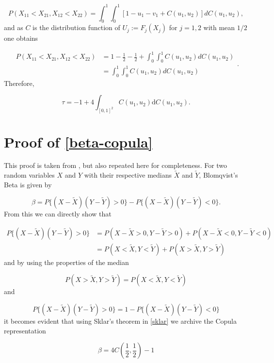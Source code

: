 \begin{equation*}
		P\left(X_{11}<X_{21}, X_{12}<X_{22}\right)=\int_{0}^{1} \int_{0}^{1}\left[1-u_{1}-v_{1}+C\left(u_{1}, u_{2}\right)\right] d C\left(u_{1}, u_{2}\right),
\end{equation*}
%
and as $C$ is the distribution function of $U_j := F_j(X_j)$ for $j = 1,2$ with mean $1/2$ one obtains

\begin{equation*}
	\begin{aligned}
		P\left(X_{11}<X_{21}, X_{12}<X_{22}\right) &=1-\frac{1}{2}-\frac{1}{2}+\int_{0}^{1} \int_{0}^{1} C\left(u_{1}, u_{2}\right) d C\left(u_{1}, u_{2}\right) \\
		&=\int_{0}^{1} \int_{0}^{1} C\left(u_{1}, u_{2}\right) d C\left(u_{1}, u_{2}\right)
	\end{aligned}.
\end{equation*}
%
Therefore, 

\begin{equation}
	\tau=-1+4 \int_{[0,1]^{2}} C\left(u_{1}, u_{2}\right) \mathrm{d} C\left(u_{1}, u_{2}\right).
\end{equation}

\section{Proof of \ref{beta-copula}}

This proof is taken from \citet{genest2013copula}, but also repeated here for completeness. For two random variables $X$ and $Y$ with their respective medians $\tilde{X}$ and $\tilde{Y}$, Blomqvist's Beta is given by 

\begin{equation*}
	\beta=P\{(X-\tilde{X})(Y-\tilde{Y})>0\}-P\{(X-\tilde{X})(Y-\tilde{Y})<0\} .
\end{equation*}
%
From this we can directly show that

\begin{equation*}
	\begin{split}
		P\{(X-\tilde{X})(Y-\tilde{Y})>0\}&=P(X-\tilde{X}>0, Y-\tilde{Y}>0)+P(X-\tilde{X}<0, Y-\tilde{Y}<0) \\
		&= P(X<\tilde{X},Y<\tilde{Y}) + P(X>\tilde{X},Y>\tilde{Y}) 
	\end{split}
\end{equation*}
%
and by using the properties of the median

\begin{equation*}
	P(X>\tilde{X}, Y>\tilde{Y})=P(X<\tilde{X}, Y<\tilde{Y})
\end{equation*}
%
and

\begin{equation*}
	P\{(X-\tilde{X})(Y-\tilde{Y})>0\} = 1- P\{(X-\tilde{X})(Y-\tilde{Y})<0\}
\end{equation*}
it becomes evident that using Sklar's theorem in \ref{sklar} we archive the Copula representation

\begin{equation}
	\beta =4 C\left(\frac{1}{2}, \frac{1}{2}\right) -1
\end{equation}